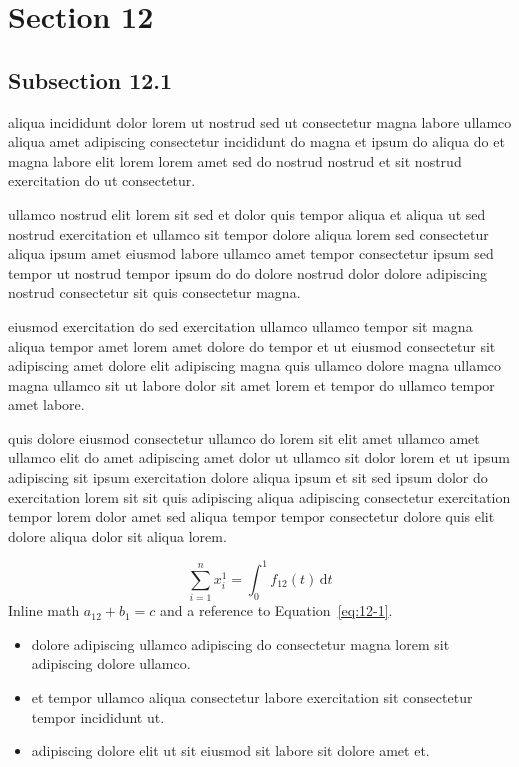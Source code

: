 \documentclass{article}
\begin{document}
\section{Section 12}\label{sec:12}
\subsection{Subsection 12.1}\label{sec:12-1}
aliqua incididunt dolor lorem ut nostrud sed ut consectetur magna labore ullamco aliqua amet adipiscing consectetur incididunt do magna et ipsum do aliqua do et magna labore elit lorem lorem amet sed do nostrud nostrud et sit nostrud exercitation do ut consectetur.

ullamco nostrud elit lorem sit sed et dolor quis tempor aliqua et aliqua ut sed nostrud exercitation et ullamco sit tempor dolore aliqua lorem sed consectetur aliqua ipsum amet eiusmod labore ullamco amet tempor consectetur ipsum sed tempor ut nostrud tempor ipsum do do dolore nostrud dolor dolore adipiscing nostrud consectetur sit quis consectetur magna.

eiusmod exercitation do sed exercitation ullamco ullamco tempor sit magna aliqua tempor amet lorem amet dolore do tempor et ut eiusmod consectetur sit adipiscing amet dolore elit adipiscing magna quis ullamco dolore magna ullamco magna ullamco sit ut labore dolor sit amet lorem et tempor do ullamco tempor amet labore.

quis dolore eiusmod consectetur ullamco do lorem sit elit amet ullamco amet ullamco elit do amet adipiscing amet dolor ut ullamco sit dolor lorem et ut ipsum adipiscing sit ipsum exercitation dolore aliqua ipsum et sit sed ipsum dolor do exercitation lorem sit sit quis adipiscing aliqua adipiscing consectetur exercitation tempor lorem dolor amet sed aliqua tempor tempor consectetur dolore quis elit dolore aliqua dolor sit aliqua lorem.

\begin{equation}\label{eq:12-1}
  \sum_{i=1}^{n} x_i^{1} = \int_0^1 f_{12}(t)\,\mathrm{d}t
\end{equation}
Inline math $a_{12} + b_{1} = c$ and a reference to Equation~\eqref{eq:12-1}.

\begin{itemize}
  \item dolore adipiscing ullamco adipiscing do consectetur magna lorem sit adipiscing dolore ullamco.
  \item et tempor ullamco aliqua consectetur labore exercitation sit consectetur tempor incididunt ut.
  \item adipiscing dolore elit ut sit eiusmod sit labore sit dolore amet et.
\end{itemize}
\end{document}
